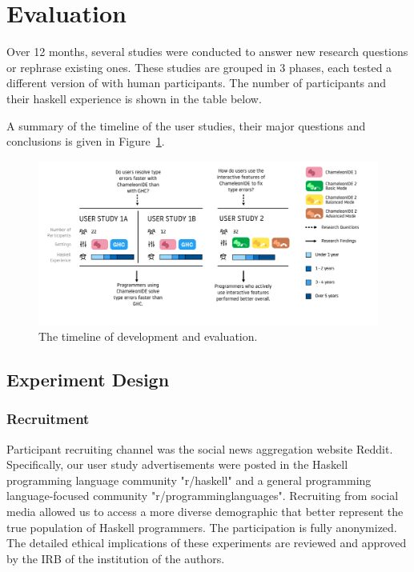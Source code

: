 \section{Evaluation}

Over 12 months, several studies were conducted to answer new research questions or rephrase existing ones. These studies are grouped in 3 phases, each tested a different version of \chameleon{} with human participants. The number of participants and their haskell experience is shown in the table below. 



A summary of the timeline of the user studies, their major questions and conclusions is given in Figure~\ref{fig:timeline}.

\begin{figure}[h]
    \centering
    \includegraphics[width=\linewidth]{images/timeline.pdf}
    \caption{The timeline of \chameleon{}  development and 
    evaluation.}
    \label{fig:timeline}
\end{figure}

\subsection{Experiment Design}
\subsubsection*{\textbf{Recruitment}}

Participant recruiting channel was the social news aggregation website Reddit. Specifically, our user study advertisements were posted in the Haskell programming language community "r/haskell" and a general programming language-focused community "r/programminglanguages". Recruiting from social media allowed us to access a more diverse demographic that better represent the true population of Haskell programmers. The participation is fully anonymized. The detailed ethical implications of these experiments are reviewed and approved by the IRB of the institution of the authors.

